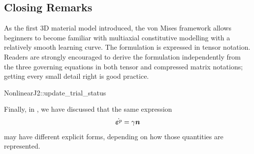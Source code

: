\subsection{Closing Remarks}
As the first 3D material model introduced, the von Mises framework allows beginners to become familiar with multiaxial constitutive modelling with a relatively smooth learning curve.
The formulation is expressed in tensor notation.
Readers are strongly encouraged to derive the formulation independently from the three governing equations in both tensor and compressed matrix notations; getting every small detail right is good practice.
\begin{cppcode}
NonlinearJ2::update_trial_status
\end{cppcode}

Finally, in , we have discussed that the same expression
\begin{gather}
    \dot{\bm{\varepsilon}^p}=\gamma\bm{n}
\end{gather}
may have different explicit forms, depending on how those quantities are represented.

